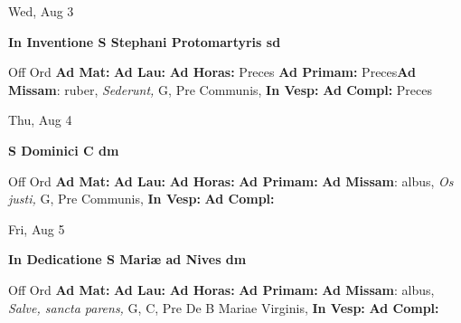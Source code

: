 \documentclass[10pt]{memoir}
\begin{document}
\begin{center}
\begin{minipage}{3.5in}
\vspace{2em}
\begin{center}Wed, Aug 3
\end{center}
\textbf{ \large In Inventione S Stephani Protomartyris
\textnormal{\normalsize sd}}

\begin{justify}Off Ord
\textbf{Ad Mat: }
\textbf{Ad Lau: }
\textbf{Ad Horas: }Preces
\textbf{Ad Primam: }Preces\textbf{Ad Missam}: ruber, \textit{Sederunt,} G, Pre Communis, 
\textbf{In Vesp: }
\textbf{Ad Compl: }Preces
\end{justify}
\end{minipage}
\end{center}

\begin{center}
\begin{minipage}{3.5in}
\vspace{2em}
\begin{center}Thu, Aug 4
\end{center}
\textbf{ \large S Dominici C
\textnormal{\normalsize dm}}

\begin{justify}Off Ord
\textbf{Ad Mat: }
\textbf{Ad Lau: }
\textbf{Ad Horas: }
\textbf{Ad Primam: }\textbf{Ad Missam}: albus, \textit{Os justi,} G, Pre Communis, 
\textbf{In Vesp: }
\textbf{Ad Compl: }
\end{justify}
\end{minipage}
\end{center}

\begin{center}
\begin{minipage}{3.5in}
\vspace{2em}
\begin{center}Fri, Aug 5
\end{center}
\textbf{ \large In Dedicatione S Mariæ ad Nives
\textnormal{\normalsize dm}}

\begin{justify}Off Ord
\textbf{Ad Mat: }
\textbf{Ad Lau: }
\textbf{Ad Horas: }
\textbf{Ad Primam: }\textbf{Ad Missam}: albus, \textit{Salve, sancta parens,} G, C, Pre De B Mariae Virginis, 
\textbf{In Vesp: }
\textbf{Ad Compl: }
\end{justify}
\end{minipage}
\end{center}
\end{document}
